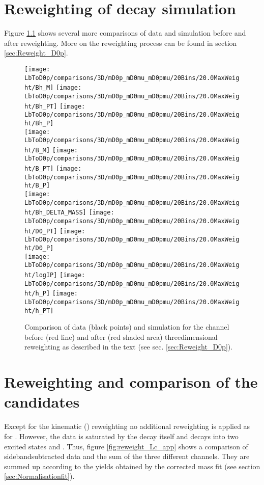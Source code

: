 \chapter{Reweighting of \LbToDpmunuX decay simulation}
\label{app:Reweight_D0p}
Figure \ref{fig:reweight_D0p_app} shows several more comparisons of data and simulation before and after reweighting.
More on the reweighting process can be found in section \ref{sec:Reweight_D0p}.
\begin{figure}[hptb]
    \centering
	\texttt{[image: LbToD0p/comparisons/3D/mD0p\_mD0mu\_mD0pmu/20Bins/20.0MaxWeight/Bh\_M]}
	\texttt{[image: LbToD0p/comparisons/3D/mD0p\_mD0mu\_mD0pmu/20Bins/20.0MaxWeight/Bh\_PT]}
	\texttt{[image: LbToD0p/comparisons/3D/mD0p\_mD0mu\_mD0pmu/20Bins/20.0MaxWeight/Bh\_P]}          \\
	\texttt{[image: LbToD0p/comparisons/3D/mD0p\_mD0mu\_mD0pmu/20Bins/20.0MaxWeight/B\_M]}           
	\texttt{[image: LbToD0p/comparisons/3D/mD0p\_mD0mu\_mD0pmu/20Bins/20.0MaxWeight/B\_PT]}
	\texttt{[image: LbToD0p/comparisons/3D/mD0p\_mD0mu\_mD0pmu/20Bins/20.0MaxWeight/B\_P]}           \\
    \texttt{[image: LbToD0p/comparisons/3D/mD0p\_mD0mu\_mD0pmu/20Bins/20.0MaxWeight/Bh\_DELTA\_MASS]}
	\texttt{[image: LbToD0p/comparisons/3D/mD0p\_mD0mu\_mD0pmu/20Bins/20.0MaxWeight/D0\_PT]}
	\texttt{[image: LbToD0p/comparisons/3D/mD0p\_mD0mu\_mD0pmu/20Bins/20.0MaxWeight/D0\_P]}          \\
    \texttt{[image: LbToD0p/comparisons/3D/mD0p\_mD0mu\_mD0pmu/20Bins/20.0MaxWeight/logIP]}
	\texttt{[image: LbToD0p/comparisons/3D/mD0p\_mD0mu\_mD0pmu/20Bins/20.0MaxWeight/h\_P]}
	\texttt{[image: LbToD0p/comparisons/3D/mD0p\_mD0mu\_mD0pmu/20Bins/20.0MaxWeight/h\_PT]}
	\caption{Comparison of data (black points) and simulation for the \LbToDpmunuX channel before (red line) and after (red shaded area) threedimensional reweighting as described in the text (see sec. \ref{sec:Reweight_D0p}).}
    \label{fig:reweight_D0p_app}
\end{figure}

\chapter{Reweighting and comparison of the \LbToLcmunu candidates}
\label{app:Reweight_Lc}
Except for the kinematic \pt(\Lb) reweighting no additional reweighting is applied as for \LbToDpmunu. 
However, the data is saturated by the decay \LbToLcmunu itself and decays into two excited states  and . 
Thus, figure \ref{fig:reweight_Lc_app} shows a comparison of sidebandsubtracted data and the sum of the three different channels.
They are summed up according to the yields obtained by the corrected mass fit (see section \ref{sec:Normalisationfit}).

